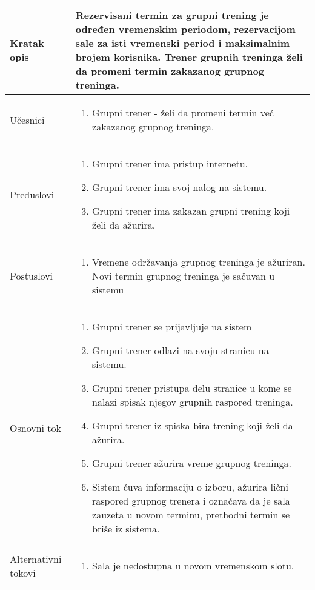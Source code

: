 \documentclass[../grupniTreninzi.tex]{subfiles}
\begin{document}
\begin{longtable}{| p{} | p{} |} 
\hline
    Kratak opis &  Rezervisani termin za grupni trening je određen vremenskim periodom, rezervacijom sale za isti vremenski period i maksimalnim brojem korisnika. Trener grupnih treninga želi da promeni termin zakazanog grupnog treninga.\\ 
\hline    
    Učesnici &
    \begin{enumerate}
        \item Grupni trener - želi da promeni termin već zakazanog grupnog treninga.
    \end{enumerate}\\
\hline
   Preduslovi & 
   \begin{enumerate}
        \item Grupni trener ima pristup internetu.
        \item Grupni trener ima svoj nalog na sistemu.
        \item Grupni trener ima zakazan grupni trening koji želi da ažurira.
    \end{enumerate}\\
\hline  
    Postuslovi &
    \begin{enumerate}
        \item Vremene održavanja grupnog treninga je ažuriran. Novi termin grupnog treninga je sačuvan u sistemu
    \end{enumerate}\\
\hline
    Osnovni tok & 
    \begin{enumerate}
        \item Grupni trener se prijavljuje na sistem
        \item Grupni trener odlazi na svoju stranicu na sistemu.
        \item Grupni trener pristupa delu stranice u kome se nalazi spisak njegov grupnih raspored treninga.
        \item Grupni trener iz spiska bira trening koji želi da ažurira.
        \item Grupni trener ažurira vreme grupnog treninga.
        \item Sistem čuva informaciju o izboru, ažurira lični raspored grupnog trenera i označava da je sala zauzeta u novom terminu, prethodni termin se briše iz sistema.
    \end{enumerate}\\
\hline
    Alternativni tokovi & 
       \begin{enumerate}
        \item Sala je nedostupna u novom vremenskom slotu. 

\end{enumerate}
\end{longtable}
\end{document}
